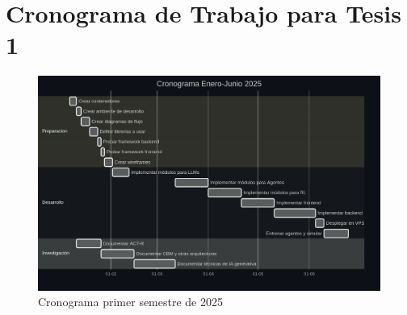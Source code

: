 
\chapter{Cronograma de Trabajo para Tesis 1}


\begin{figure}[ht]
    \centering
	\includegraphics[width=1\textwidth]{figures/cronograma_1.png}
	\caption[Cronograma primer semestre de 2025]{Cronograma primer semestre de 2025}
	\label{fig:fig_cron_1}
\end{figure}
